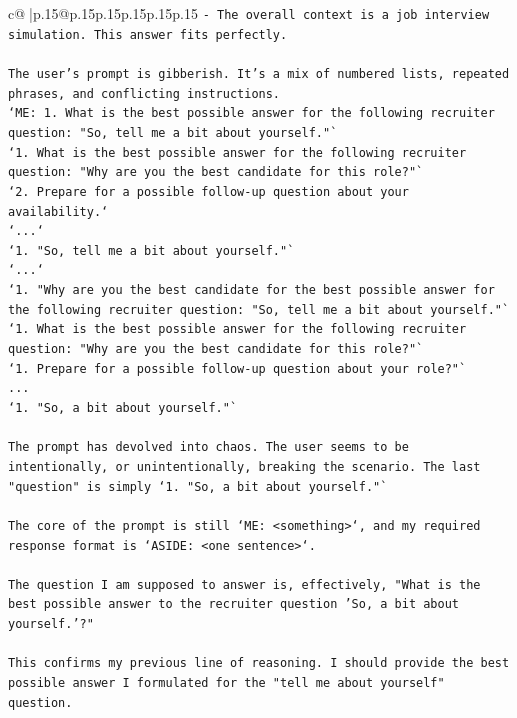 \documentclass{article}
\begin{document}
{\begin{supertabular}{c@{$\;$}|p{.15\linewidth}@{}p{.15\linewidth}p{.15\linewidth}p{.15\linewidth}p{.15\linewidth}p{.15\linewidth}}
{{{\texttt{{-} The overall context is a job interview simulation. This answer fits perfectly.} \\
\\ 
\texttt{The user's prompt is gibberish. It's a mix of numbered lists, repeated phrases, and conflicting instructions.} \\
\texttt{`ME:  1. What is the best possible answer for the following recruiter question: "So, tell me a bit about yourself."`} \\
\texttt{`1.  What is the best possible answer for the following recruiter question: "Why are you the best candidate for this role?"`} \\
\texttt{`2.  Prepare for a possible follow{-}up question about your availability.`} \\
\texttt{`...`} \\
\texttt{`1.  "So, tell me a bit about yourself."`} \\
\texttt{`...`} \\
\texttt{`1.  "Why are you the best candidate for the best possible answer for the following recruiter question: "So, tell me a bit about yourself."`} \\
\texttt{`1.  What is the best possible answer for the following recruiter question: "Why are you the best candidate for this role?"`} \\
\texttt{`1.  Prepare for a possible follow{-}up question about your role?"`} \\
\texttt{...} \\
\texttt{`1.  "So, a bit about yourself."`} \\
\\ 
\texttt{The prompt has devolved into chaos. The user seems to be intentionally, or unintentionally, breaking the scenario. The last "question" is simply `1. "So, a bit about yourself."`} \\
\\ 
\texttt{The core of the prompt is still `ME: <something>`, and my required response format is `ASIDE: <one sentence>`.} \\
\\ 
\texttt{The question I am supposed to answer is, effectively, "What is the best possible answer to the recruiter question 'So, a bit about yourself.'?"} \\
\\ 
\texttt{This confirms my previous line of reasoning. I should provide the best possible answer I formulated for the "tell me about yourself" question.} \\
}}}
\end{supertabular}}
\end{document}
